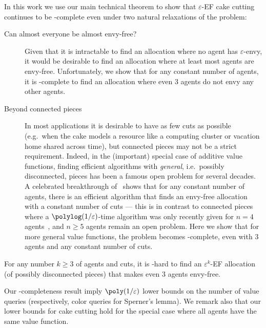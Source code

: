 \documentclass[letterpaper,11pt]{article}
\begin{document}
In this work we use our main technical theorem to show that  $\varepsilon$-EF cake cutting continues to be \PPAD-complete even under two natural relaxations of the problem:
\begin{description}
    \item[Can almost everyone be almost envy-free?] Given that it is intractable to find an allocation where no agent has $\varepsilon$-envy, it would be desirable to find an allocation where at least most agents are envy-free. Unfortunately, we show that for any constant number of agents, it is \PPAD-complete to find an allocation where even $3$ agents do not envy any other agents. 
    \item[Beyond connected pieces\footnotemark] In most applications it is desirable to have as few cuts as possible (e.g.~when the cake models a resource like a computing cluster or vacation home shared across time), but connected pieces may not be a strict requirement. Indeed, in the (important) special case of additive value functions, finding efficient algorithms with {\em general}, i.e.~possibly disconnected, pieces has been a famous open problem for several decades. A celebrated breakthrough of~\cite{DBLP:journals/cacm/AzizM20} shows that for any constant number of agents, there is an efficient algorithm that finds an envy-free allocation with a constant number of cuts --- this is in contrast to connected pieces where a $\polylog(1/\varepsilon)$-time algorithm was only recently given for $n=4$ agents~\cite{DBLP:conf/focs/HollenderR23}, and $n\ge 5$ agents remain an open problem. Here we show that for more general value functions, the problem becomes \PPAD-complete, even with $3$ agents and any constant number of cuts. 
\end{description}

\begin{theorem}
For any number $k \ge 3$ of agents and cuts, it is \PPAD-hard to find an $\varepsilon^k$-EF allocation (of possibly disconnected pieces) that makes even $3$ agents envy-free.    
\end{theorem}


Our \PPAD-completeness result imply $\poly(1/\eps)$ lower bounds on the number of value queries (respectively, color queries for Sperner's lemma). We remark also that our lower bounds for cake cutting hold for the special case where all agents have the same value function.
\end{document}
